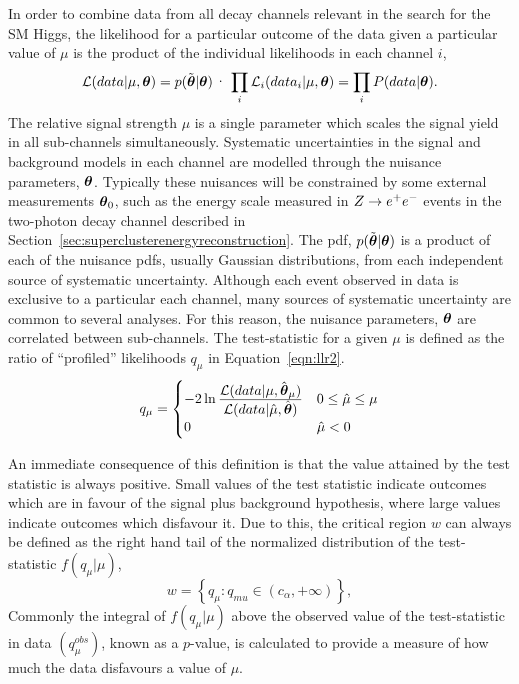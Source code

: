 In order to combine data from all decay channels relevant in the search for the
SM Higgs, the likelihood for a particular outcome of the data given a particular
value of $\mu$ is the product of the individual likelihoods in each channel $i$,
\begin{equation}
\mathcal{L}(data|\mu,\boldth)= p(\boldthmeas|\boldth)\cdot\prod_{i}\mathcal{L}_{i}(data_{i}|\mu,\boldth)
= \prod_{i}P(data|\boldth) .
\end{equation}
The relative signal strength $\mu$ is a single parameter which scales the signal
yield in all sub-channels simultaneously. 
Systematic uncertainties in the signal and background models in each channel
are modelled through the nuisance parameters, ${\boldsymbol{\theta}}$. Typically these nuisances
will be constrained by some external measurements ${\boldsymbol{\theta}}_{0}$, such as the energy scale
measured in $Z\rightarrow e^{+}e^{-}$ events in the two-photon decay channel described in 
Section~\ref{sec:superclusterenergyreconstruction}. 
The pdf, $p(\tilde{{\boldsymbol{\theta}}}|{\boldsymbol{\theta}})$ is a product of each of the 
nuisance pdfs, usually Gaussian distributions, from each independent source of systematic
uncertainty.
Although each event observed in data is exclusive to a particular each channel, 
many sources of systematic uncertainty are common to several analyses. For this
reason, the nuisance parameters, ${\boldsymbol{\theta}}$ are correlated between sub-channels.
The test-statistic for a given $\mu$ is defined as the ratio 
of ``profiled'' likelihoods $q_{\mu}$ in Equation~\ref{eqn:llr2}.
\begin{equation}
q_{\mu} = 
	\begin {cases} 
	-2\ln\frac{\displaystyle \mathcal{L}(data | \mu,\hat{{\boldsymbol{\theta}}}_{\mu})}
	{\displaystyle \mathcal{L}(data | \hat{\mu},\hat{{\boldsymbol{\theta}}})} 
		&  0 \le \hat{\mu} \le \mu \\
	 0 	&  \hat{\mu} < 0
	\end{cases}
\label{eqn:llr2}
\end{equation}

An immediate consequence of this definition is that the value attained
by the test statistic is always positive. Small values of the test
statistic indicate outcomes which are in favour of the signal plus background 
hypothesis, where large values indicate outcomes which disfavour it.
Due to this, the critical region $w$ can always be defined as the right
hand tail of the normalized distribution of the test-statistic $f(q_{\mu}|\mu)$, 
\begin{equation}
w = \left\{ q_{\mu} : q_{mu} \in (c_{\alpha},+\infty) \right\},
\end{equation}
Commonly the integral of $f(q_{\mu}|\mu)$ above the observed value of the 
test-statistic in data $(q_{\mu}^{obs})$, known as a $p$-value, is calculated
to provide a measure of how much the data disfavours a value of $\mu$. 

